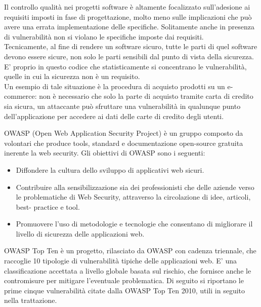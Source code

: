 Il controllo qualità nei progetti software è altamente focalizzato sull'adesione ai requisiti imposti in fase di progettazione, molto meno sulle implicazioni che può avere una errata implementazione delle specifiche. Solitamente anche in presenza di vulnerabilità non si violano le specifiche imposte dai requisiti.\\
Tecnicamente, al fine di rendere un software sicuro, tutte le parti di quel software devono essere sicure, non solo le parti sensibili dal punto di vista della sicurezza. E' proprio in questo codice che statisticamente si concentrano le vulnerabilità, quelle in cui la sicurezza non è un requisito. \\
Un esempio di tale situazione è la procedura di acquisto prodotti su un e-commerce: non è necessario che solo la parte di acquisto tramite carta di credito sia sicura, un attaccante può sfruttare una vulnerabilità in qualunque punto dell'applicazione per accedere ai dati delle carte di credito degli utenti.

OWASP (Open Web Application Security Project) è un gruppo composto da volontari che produce tools, standard e documentazione open-source gratuita inerente la web security. 
Gli obiettivi di OWASP sono i seguenti:
\begin{itemize}
\item Diffondere la cultura dello sviluppo di applicativi web sicuri.
\item Contribuire alla sensibilizzazione sia dei professionisti che delle aziende verso le problematiche di Web Security, attraverso la circolazione di idee, articoli, best- practice e tool.
\item Promuovere l’uso di metodologie e tecnologie che consentano di migliorare il livello di sicurezza delle applicazioni web.
\end{itemize}
OWASP Top Ten è un progetto, rilasciato da OWASP con cadenza triennale, che raccoglie 10 tipologie di vulnerabilità tipiche delle applicazioni web. E' una classificazione accettata a livello globale basata sul rischio, che fornisce anche le contromisure per mitigare l'eventuale problematica. Di seguito si riportano le prime cinque vulnerabilità citate dalla OWASP Top Ten 2010, utili in seguito nella trattazione.

